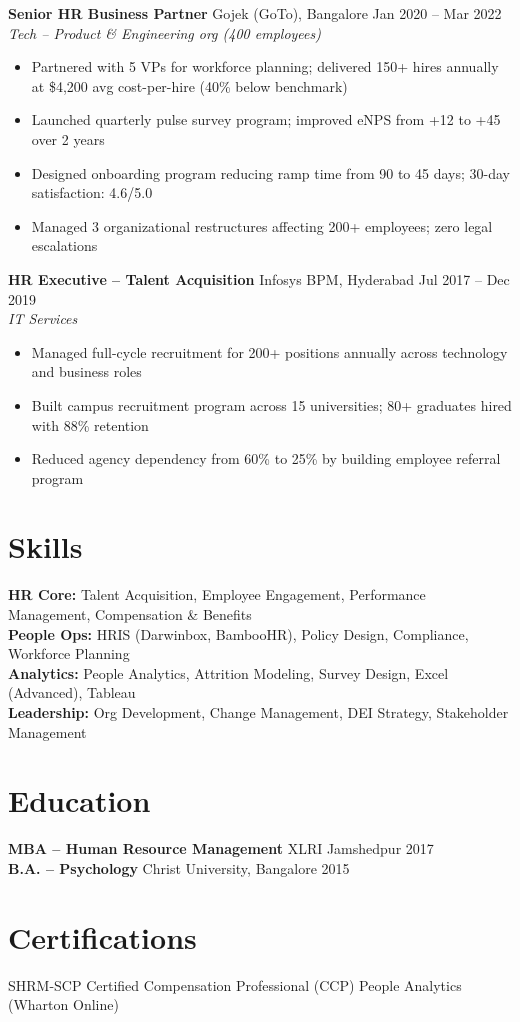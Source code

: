 \documentclass[10pt,a4paper]{article}
\begin{document}
\textbf{Senior HR Business Partner} \quad\textbar\quad Gojek (GoTo), Bangalore \hfill Jan 2020 -- Mar 2022\\
\textit{\color{accent}Tech -- Product \& Engineering org (400 employees)}
\begin{itemize}
  \item Partnered with 5 VPs for workforce planning; delivered 150+ hires annually at \$4,200 avg cost-per-hire (40\% below benchmark)
  \item Launched quarterly pulse survey program; improved eNPS from +12 to +45 over 2 years
  \item Designed onboarding program reducing ramp time from 90 to 45 days; 30-day satisfaction: 4.6/5.0
  \item Managed 3 organizational restructures affecting 200+ employees; zero legal escalations
\end{itemize}

\textbf{HR Executive -- Talent Acquisition} \quad\textbar\quad Infosys BPM, Hyderabad \hfill Jul 2017 -- Dec 2019\\
\textit{\color{accent}IT Services}
\begin{itemize}
  \item Managed full-cycle recruitment for 200+ positions annually across technology and business roles
  \item Built campus recruitment program across 15 universities; 80+ graduates hired with 88\% retention
  \item Reduced agency dependency from 60\% to 25\% by building employee referral program
\end{itemize}

\section{Skills}
\textbf{HR Core:} Talent Acquisition, Employee Engagement, Performance Management, Compensation \& Benefits\\
\textbf{People Ops:} HRIS (Darwinbox, BambooHR), Policy Design, Compliance, Workforce Planning\\
\textbf{Analytics:} People Analytics, Attrition Modeling, Survey Design, Excel (Advanced), Tableau\\
\textbf{Leadership:} Org Development, Change Management, DEI Strategy, Stakeholder Management

\section{Education}
\textbf{MBA -- Human Resource Management} \hfill XLRI Jamshedpur \hfill 2017\\
\textbf{B.A. -- Psychology} \hfill Christ University, Bangalore \hfill 2015

\section{Certifications}
SHRM-SCP \quad\textbullet\quad Certified Compensation Professional (CCP) \quad\textbullet\quad People Analytics (Wharton Online)
\end{document}
